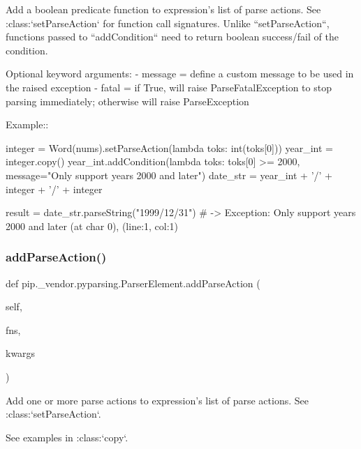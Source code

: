 \begin{DoxyVerb}Add a boolean predicate function to expression's list of parse actions. See
:class:`setParseAction` for function call signatures. Unlike ``setParseAction``,
functions passed to ``addCondition`` need to return boolean success/fail of the condition.

Optional keyword arguments:
- message = define a custom message to be used in the raised exception
- fatal   = if True, will raise ParseFatalException to stop parsing immediately; otherwise will raise ParseException

Example::

    integer = Word(nums).setParseAction(lambda toks: int(toks[0]))
    year_int = integer.copy()
    year_int.addCondition(lambda toks: toks[0] >= 2000, message="Only support years 2000 and later")
    date_str = year_int + '/' + integer + '/' + integer

    result = date_str.parseString("1999/12/31")  # -> Exception: Only support years 2000 and later (at char 0), (line:1, col:1)
\end{DoxyVerb}
 \mbox{\label{classpip_1_1__vendor_1_1pyparsing_1_1ParserElement_af122b31c7582cc1f2173ff99e2eed313}} 
\subsubsection{\texorpdfstring{add\+Parse\+Action()}{addParseAction()}}
{\footnotesize\ttfamily def pip.\+\_\+vendor.\+pyparsing.\+Parser\+Element.\+add\+Parse\+Action (\begin{DoxyParamCaption}\item[{}]{self,  }\item[{}]{fns,  }\item[{}]{kwargs }\end{DoxyParamCaption})}

\begin{DoxyVerb}Add one or more parse actions to expression's list of parse actions. See :class:`setParseAction`.

See examples in :class:`copy`.
\end{DoxyVerb}
 \mbox{\label{classpip_1_1__vendor_1_1pyparsing_1_1ParserElement_acd312823031264fcad42f4755b1c7172}} 
